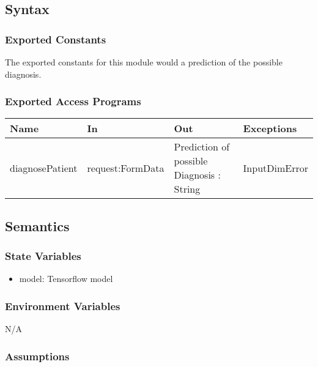 \documentclass[12pt, titlepage]{article}
\begin{document}
\subsection{Syntax}

\subsubsection{Exported Constants}
The exported constants for this module would a prediction of the possible diagnosis.

\subsubsection{Exported Access Programs}

\begin{center}
\begin{tabular}{p{2cm} p{4cm} p{4cm} p{2cm}}
\hline
\textbf{Name} & \textbf{In} & \textbf{Out} & \textbf{Exceptions} \\
\hline
diagnosePatient & request:FormData & Prediction of possible Diagnosis : String & InputDimError \\
\hline
\end{tabular}
\end{center}

\subsection{Semantics}

\subsubsection{State Variables}

\begin{itemize}
  \item model: Tensorflow model
\end{itemize}

\subsubsection{Environment Variables}

N/A

\subsubsection{Assumptions}
\end{document}
